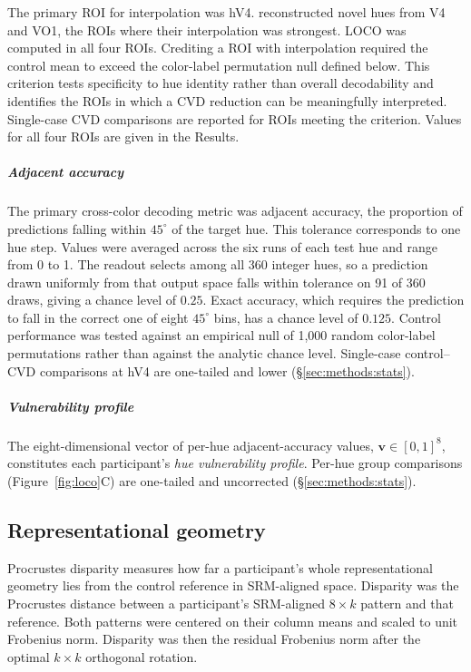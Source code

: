 The primary ROI for interpolation was hV4. \textcite{brouwer2009} reconstructed novel hues from V4 and VO1, the ROIs where their interpolation was strongest. LOCO was computed in all four ROIs. Crediting a ROI with interpolation required the control mean to exceed the color-label permutation null defined below. This criterion tests specificity to hue identity rather than overall decodability and identifies the ROIs in which a CVD reduction can be meaningfully interpreted. Single-case CVD comparisons are reported for ROIs meeting the criterion. Values for all four ROIs are given in the Results.

\subparagraph{Adjacent accuracy}
The primary cross-color decoding metric was adjacent accuracy, the proportion of predictions falling within $45^\circ$ of the target hue. This tolerance corresponds to one hue step. Values were averaged across the six runs of each test hue and range from 0 to 1. The readout selects among all 360 integer hues, so a prediction drawn uniformly from that output space falls within tolerance on 91 of 360 draws, giving a chance level of $0.25$. Exact accuracy, which requires the prediction to fall in the correct one of eight $45^\circ$ bins, has a chance level of $0.125$. Control performance was tested against an empirical null of 1,000 random color-label permutations rather than against the analytic chance level. Single-case control--CVD comparisons at hV4 are one-tailed and lower (\S\ref{sec:methods:stats}).

\subparagraph{Vulnerability profile}
The eight-dimensional vector of per-hue adjacent-accuracy values, $\mathbf{v} \in [0,1]^8$, constitutes each participant's \emph{hue vulnerability profile}. Per-hue group comparisons (Figure~\ref{fig:loco}C) are one-tailed and uncorrected (\S\ref{sec:methods:stats}).

\subsection{Representational geometry}
\label{sec:methods:rdm}

Procrustes disparity measures how far a participant's whole representational geometry lies from the control reference in SRM-aligned space. Disparity was the Procrustes distance between a participant's SRM-aligned $8 \times k$ pattern and that reference. Both patterns were centered on their column means and scaled to unit Frobenius norm. Disparity was then the residual Frobenius norm after the optimal $k \times k$ orthogonal rotation.

